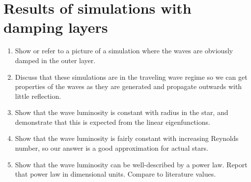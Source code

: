 \section{Results of simulations with damping layers}
\label{sec:results_damping}

\begin{enumerate}
\item Show or refer to a picture of a simulation where the waves are obviously damped in the outer layer.
\item Discuss that these simulations are in the traveling wave regime so we can get properties of the waves as they are generated and propagate outwards with little reflection.
\item Show that the wave luminosity is constant with radius in the star, and demonstrate that this is expected from the linear eigenfunctions.
\item Show that the wave luminosity is fairly constant with increasing Reynolds number, so our answer is a good approximation for actual stars.
\item Show that the wave luminosity can be well-described by a power law. Report that power law in dimensional units. Compare to literature values.
\end{enumerate}
